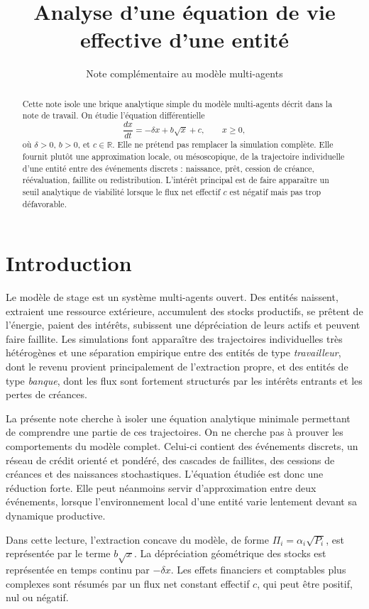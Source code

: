\documentclass[11pt,a4paper]{article}
\title{Analyse d'une équation de vie effective d'une entité}
\author{Note complémentaire au modèle multi-agents}
\date{}
\begin{document}
\maketitle

\begin{abstract}
Cette note isole une brique analytique simple du modèle multi-agents décrit dans la note de travail. On étudie l'équation différentielle
\[
    \frac{dx}{dt}=-\delta x+b\sqrt{x}+c,\qquad x\geq 0,
\]
où \(\delta>0\), \(b>0\), et \(c\in\mathbb{R}\). Elle ne prétend pas remplacer la simulation complète. Elle fournit plutôt une approximation locale, ou mésoscopique, de la trajectoire individuelle d'une entité entre des événements discrets : naissance, prêt, cession de créance, réévaluation, faillite ou redistribution. L'intérêt principal est de faire apparaître un seuil analytique de viabilité lorsque le flux net effectif \(c\) est négatif mais pas trop défavorable.
\end{abstract}

\section{Introduction}

Le modèle de stage est un système multi-agents ouvert. Des entités naissent, extraient une ressource extérieure, accumulent des stocks productifs, se prêtent de l'énergie, paient des intérêts, subissent une dépréciation de leurs actifs et peuvent faire faillite. Les simulations font apparaître des trajectoires individuelles très hétérogènes et une séparation empirique entre des entités de type \emph{travailleur}, dont le revenu provient principalement de l'extraction propre, et des entités de type \emph{banque}, dont les flux sont fortement structurés par les intérêts entrants et les pertes de créances.

La présente note cherche à isoler une équation analytique minimale permettant de comprendre une partie de ces trajectoires. On ne cherche pas à prouver les comportements du modèle complet. Celui-ci contient des événements discrets, un réseau de crédit orienté et pondéré, des cascades de faillites, des cessions de créances et des naissances stochastiques. L'équation étudiée est donc une réduction forte. Elle peut néanmoins servir d'approximation entre deux événements, lorsque l'environnement local d'une entité varie lentement devant sa dynamique productive.

Dans cette lecture, l'extraction concave du modèle, de forme \(\Pi_i=\alpha_i\sqrt{P_i}\), est représentée par le terme \(b\sqrt{x}\). La dépréciation géométrique des stocks est représentée en temps continu par \(-\delta x\). Les effets financiers et comptables plus complexes sont résumés par un flux net constant effectif \(c\), qui peut être positif, nul ou négatif.
\end{document}
